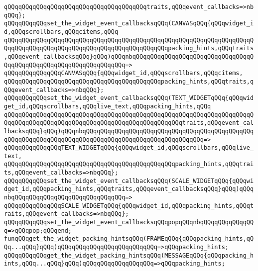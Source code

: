 \verb|qQQqqQQqqQQqqQQqqQQqqQQqqQQqqQQqqQQqqQQqtraits,qQQqevent_callbacks=>nbqQQq};|\newline
\verb|qQQqqQQqqQQqset_the_widget_event_callbacksqQQq(CANVASqQQq{qQQqwidget_id,qQQqscrollbars,qQQqcitems,qQQq|\newline
\verb|qQQqqQQqqQQqqQQqqQQqqQQqqQQqqQQqqQQqqQQqqQQqqQQqqQQqqQQqqQQqqQQqqQQqqQQqqQQqqQQqqQQqqQQqqQQqqQQqqQQqqQQqqQQqqQQqqQQqpacking_hints,qQQqtraits,qQQqevent_callbacksqQQq}qQQq)qQQqnbqQQqqQQqqQQqqQQqqQQqqQQqqQQqqQQqqQQqqQQqqQQqqQQqqQQqqQQqqQQqqQQqqQQq=>|\newline
\verb|qQQqqQQqqQQqqQQqCANVASqQQq{qQQqwidget_id,qQQqscrollbars,qQQqcitems,|\newline
\verb|qQQqqQQqqQQqqQQqqQQqqQQqqQQqqQQqqQQqqQQqqQQqpacking_hints,qQQqtraits,qQQqevent_callbacks=>nbqQQq};|\newline
\verb|qQQqqQQqqQQqset_the_widget_event_callbacksqQQq(TEXT_WIDGETqQQq{qQQqwidget_id,qQQqscrollbars,qQQqlive_text,qQQqpacking_hints,qQQq|\newline
\verb|qQQqqQQqqQQqqQQqqQQqqQQqqQQqqQQqqQQqqQQqqQQqqQQqqQQqqQQqqQQqqQQqqQQqqQQqqQQqqQQqqQQqqQQqqQQqqQQqqQQqqQQqqQQqqQQqqQQqqQQqtraits,qQQqevent_callbacksqQQq}qQQq)qQQqnbqQQqqQQqqQQqqQQqqQQqqQQqqQQqqQQqqQQqqQQqqQQqqQQqqQQqqQQqqQQqqQQqqQQqqQQqqQQqqQQqqQQqqQQqqQQqqQQqqQQqqQQq=>|\newline
\verb|qQQqqQQqqQQqqQQqTEXT_WIDGETqQQq{qQQqwidget_id,qQQqscrollbars,qQQqlive_text,|\newline
\verb|qQQqqQQqqQQqqQQqqQQqqQQqqQQqqQQqqQQqqQQqqQQqqQQqpacking_hints,qQQqtraits,qQQqevent_callbacks=>nbqQQq};|\newline
\verb|qQQqqQQqqQQqset_the_widget_event_callbacksqQQq(SCALE_WIDGETqQQq{qQQqwidget_id,qQQqpacking_hints,qQQqtraits,qQQqevent_callbacksqQQq}qQQq)qQQqnbqQQqqQQqqQQqqQQqqQQqqQQqqQQqqQQq=>|\newline
\verb|qQQqqQQqqQQqqQQqSCALE_WIDGETqQQq{qQQqwidget_id,qQQqpacking_hints,qQQqtraits,qQQqevent_callbacks=>nbqQQq};|\newline
\verb|qQQqqQQqqQQqset_the_widget_event_callbacksqQQqpopqQQqnbqQQqqQQqqQQqqQQq=>qQQqpop;qQQqend;|\newline
\newline
\newline
\verb|funqQQqget_the_widget_packing_hintsqQQq(FRAMEqQQq{qQQqpacking_hints,qQQq...qQQq}qQQq)qQQqqQQqqQQqqQQqqQQqqQQqqQQq=>qQQqpacking_hints;|\newline
\verb|qQQqqQQqqQQqget_the_widget_packing_hintsqQQq(MESSAGEqQQq{qQQqpacking_hints,qQQq...qQQq}qQQq)qQQqqQQqqQQqqQQqqQQq=>qQQqpacking_hints;|\newline
